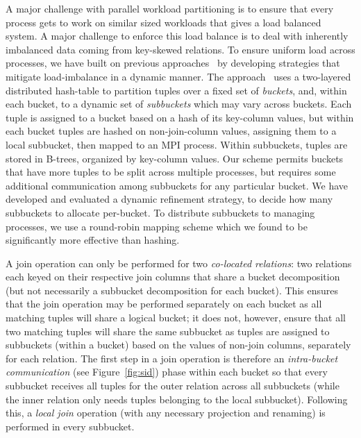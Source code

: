 A major challenge with parallel workload partitioning is to ensure that every process gets to work on similar sized workloads that gives a load balanced system. A major challenge to enforce this load balance is to deal with inherently imbalanced data coming from key-skewed relations. To ensure uniform load across processes, we have built on previous approaches~\cite{kumar:hipc:2019, Kumar:2020} by developing strategies that mitigate load-imbalance in a dynamic manner. 
The approach~\cite{kumar:hipc:2019} uses a two-layered distributed hash-table to partition tuples over a fixed set of \emph{buckets}, and, within each bucket, to a dynamic set of \emph{subbuckets} which may vary across buckets. Each tuple is assigned to a bucket based on a hash of its key-column values, but within each bucket tuples are hashed on non-join-column values, assigning them to a local subbucket, then mapped to an MPI process. Within subbuckets, tuples are stored in B-trees, organized by key-column values. Our scheme permits buckets that have more tuples to be split across multiple processes, but requires some additional communication among subbuckets for any particular bucket. We have developed and evaluated a dynamic refinement strategy, to decide how many subbuckets to allocate per-bucket. To distribute subbuckets to managing processes, we use a round-robin mapping scheme which we found to be significantly more effective than hashing.

A join operation can only be performed for two \emph{co-located relations}: two relations each keyed on their respective join columns that share a bucket decomposition (but not necessarily a subbucket decomposition for each bucket). This ensures that the join operation may be performed separately on each bucket as all matching tuples will share a logical bucket; it does not, however, ensure that all two matching tuples will share the same subbucket as tuples are assigned to subbuckets (within a bucket) based on the values of non-join columns, separately for each relation.
The first step in a join operation is therefore an \emph{intra-bucket communication} (see Figure~\ref{fig:sid}) phase within each bucket so that every subbucket receives all tuples for the outer relation across all subbuckets (while the inner relation only needs tuples belonging to the local subbucket). Following this, a \emph{local join} operation (with any necessary projection and renaming) is performed in every subbucket.

